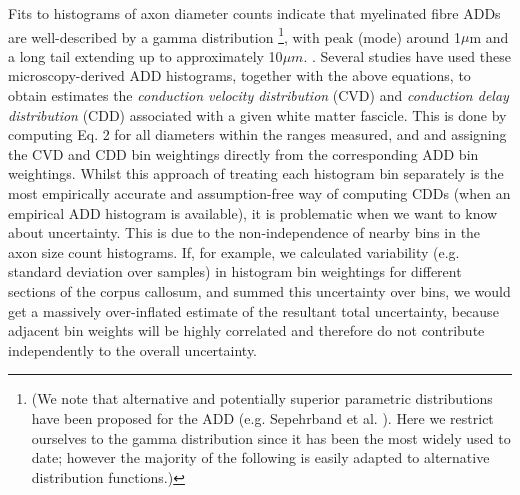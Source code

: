 Fits to histograms of axon diameter counts indicate that myelinated fibre ADDs are well-described by a gamma distribution
\footnote{(We note that alternative and potentially superior parametric distributions have been proposed for the ADD (e.g. Sepehrband et al. \citep{sepehrband2016parametric}). Here we restrict ourselves to the gamma distribution since it has been the most widely used to date; however the majority of the following is easily adapted to alternative distribution functions.)}, with peak (mode) around 1$\mu$m and a long tail extending up to approximately 10$\mu m$. \citep{aboitiz1992fiber}. Several studies have used these microscopy-derived ADD histograms, together with the above equations, to obtain estimates the \textit{conduction velocity distribution} (CVD) and \textit{conduction delay distribution} (CDD) associated with a given white matter fascicle. This is done by computing Eq. 2 for all diameters within the ranges measured, and and assigning the CVD and CDD bin weightings directly from the corresponding ADD bin weightings. Whilst this approach of treating each histogram bin separately is the most empirically accurate and assumption-free way of computing CDDs (when an empirical ADD histogram is available), it is problematic when we want to know about uncertainty. This is due to the non-independence of nearby bins in the axon size count histograms. If, for example, we calculated variability (e.g. standard deviation over samples) in histogram bin weightings for different sections of the corpus callosum, and summed this uncertainty over bins, we would get a massively over-inflated estimate of the resultant total uncertainty, because adjacent bin weights will be highly correlated and therefore do not contribute independently to the overall uncertainty. 
